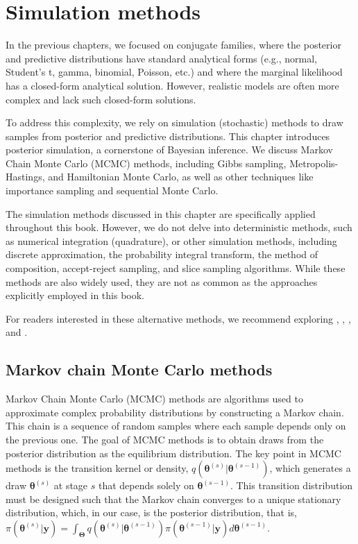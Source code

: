 \chapter{Simulation methods}\label{chap5}

In the previous chapters, we focused on conjugate families, where the posterior and predictive distributions have standard analytical forms (e.g., normal, Student's t, gamma, binomial, Poisson, etc.) and where the marginal likelihood has a closed-form analytical solution. However, realistic models are often more complex and lack such closed-form solutions.

To address this complexity, we rely on simulation (stochastic) methods to draw samples from posterior and predictive distributions. This chapter introduces posterior simulation, a cornerstone of Bayesian inference. We discuss Markov Chain Monte Carlo (MCMC) methods, including Gibbs sampling, Metropolis-Hastings, and Hamiltonian Monte Carlo, as well as other techniques like importance sampling and sequential Monte Carlo.

The simulation methods discussed in this chapter are specifically applied throughout this book. However, we do not delve into deterministic methods, such as numerical integration (quadrature), or other simulation methods, including discrete approximation, the probability integral transform, the method of composition, accept-reject sampling, and slice sampling algorithms. While these methods are also widely used, they are not as common as the approaches explicitly employed in this book.

For readers interested in these alternative methods, we recommend exploring \cite[Chaps.~2 and 3]{robert2010introducing}, \cite[Chaps.~2, 3, and 8]{robert2011monte}, \cite[Chap.~5]{greenberg2012introduction}, and \cite[Chap.~10]{gelman2021bayesian}.

\section{Markov chain Monte Carlo methods}\label{sec51}

Markov Chain Monte Carlo (MCMC) methods are algorithms used to approximate complex probability distributions by constructing a Markov chain. This chain is a sequence of random samples where each sample depends only on the previous one. The goal of MCMC methods is to obtain draws from the posterior distribution as the equilibrium distribution. The key point in MCMC methods is the transition kernel or density, $q(\bm{\theta}^{(s)}|\bm{\theta}^{(s-1)})$, which generates a draw $\bm{\theta}^{(s)}$ at stage $s$ that depends solely on $\bm{\theta}^{(s-1)}$. This transition distribution must be designed such that the Markov chain converges to a unique stationary distribution, which, in our case, is the posterior distribution, that is, $\pi(\bm{\theta}^{(s)}|\bm{y})=\int_{\bm{\Theta}}q(\bm{\theta}^{(s)}|\bm{\theta}^{(s-1)})\pi(\bm{\theta}^{(s-1)}|\bm{y})d\bm{\theta}^{(s-1)}$.

